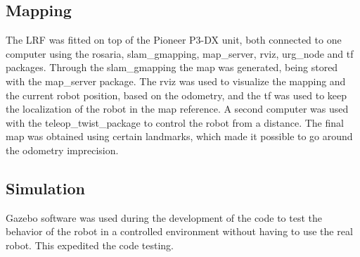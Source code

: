 \subsection{Mapping}
\label{subsec:mapping}
The LRF was fitted on top of the Pioneer P3-DX unit, both connected to one computer using the rosaria, slam\_gmapping, map\_server, rviz, urg\_node and tf packages. Through the slam\_gmapping the map was generated, being stored with the map\_server package. The rviz was used to visualize the mapping and the current robot position, based on the odometry, and the tf was used to keep the localization of the robot in the map reference. A second computer was used with the teleop\_twist\_package to control the robot from a distance. The final map was obtained using certain landmarks, which made it possible to go around the odometry imprecision.

\subsection{Simulation}
\label{subsec:simulation}
Gazebo software was used during the development of the code to test the behavior of the robot in a controlled environment without having to use the real robot. This expedited the code testing.